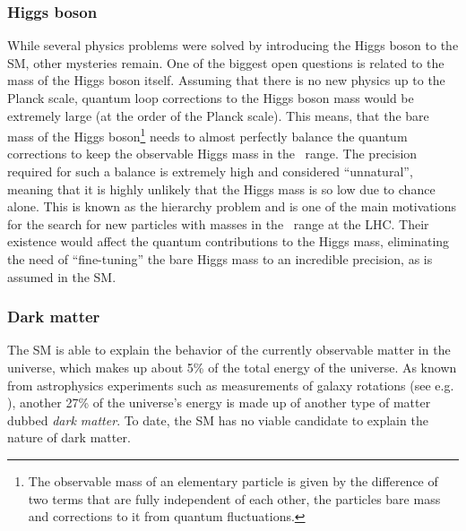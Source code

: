 


\subsubsection{Higgs boson}
While several physics problems were solved by introducing the Higgs boson to the SM, other mysteries remain. 
One of the biggest open questions is related to the mass of the Higgs boson itself. 
Assuming that there is no new physics up to the Planck scale, quantum loop corrections to the Higgs boson mass would be extremely large (at the order of the Planck scale). 
This means, that the bare mass of the Higgs boson\footnote{The observable mass of an elementary particle is given by the difference of two terms that are fully independent of each other, the particles bare mass and corrections to it from quantum fluctuations.}
needs to almost perfectly balance the quantum corrections to keep the observable Higgs mass in the \GeV\ range. The precision required for such a balance is extremely high and considered ``unnatural'', meaning that it is highly unlikely that the Higgs mass is so low due to chance alone. 
This is known as the hierarchy problem and is one of the main motivations for the search for new particles with masses in the \TeV\ range at the LHC. Their existence would affect the quantum contributions to the Higgs mass, eliminating the need of ``fine-tuning'' the bare Higgs mass to an incredible precision, as is assumed in the SM. 

\subsubsection{Dark matter}
The SM is able to explain the behavior of the currently observable matter in the universe, which makes up about 5\% of the total energy of the universe. 
As known from astrophysics experiments such as measurements of galaxy rotations (see e.g. ), another 27\% of the universe's energy is made up of another type of matter dubbed \emph{dark matter}. To date, the SM has no viable candidate to explain the nature of dark matter. 

